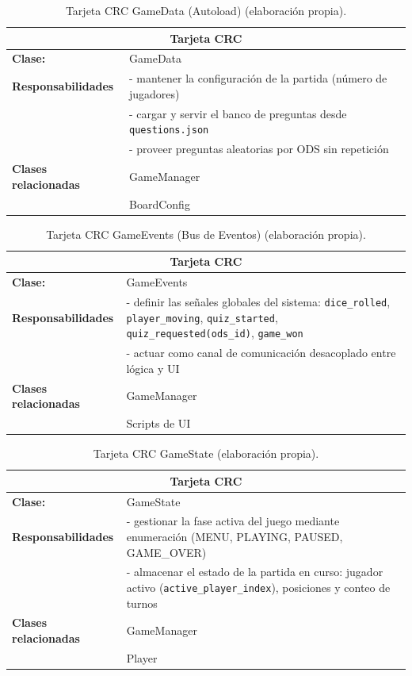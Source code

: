 \begin{table}[H]
\centering
\caption{Tarjeta CRC GameData (Autoload) (elaboración propia).\label{tab:crc_gamedata}}
\begin{tabular}{|p{}|p{}|}
\hline
\multicolumn{2}{|c|}{\textbf{Tarjeta CRC}} \\
\hline
\textbf{Clase:} & GameData \\
\hline
\textbf{Responsabilidades} & - mantener la configuración de la partida (número de jugadores) \\
& - cargar y servir el banco de preguntas desde \texttt{questions.json} \\
& - proveer preguntas aleatorias por ODS sin repetición \\
\hline
\textbf{Clases relacionadas} & GameManager \\
& BoardConfig \\
\hline
\end{tabular}
\end{table}

\begin{table}[H]
\centering
\caption{Tarjeta CRC GameEvents (Bus de Eventos) (elaboración propia).\label{tab:crc_gameevents}}
\begin{tabular}{|p{}|p{}|}
\hline
\multicolumn{2}{|c|}{\textbf{Tarjeta CRC}} \\
\hline
\textbf{Clase:} & GameEvents \\
\hline
\textbf{Responsabilidades} & - definir las se\~nales globales del sistema: \texttt{dice\_rolled}, \texttt{player\_moving}, \texttt{quiz\_started}, \texttt{quiz\_requested(ods\_id)}, \texttt{game\_won} \\
& - actuar como canal de comunicación desacoplado entre lógica y UI \\
\hline
\textbf{Clases relacionadas} & GameManager \\
& Scripts de UI \\
\hline
\end{tabular}
\end{table}

\begin{table}[H]
\centering
\caption{Tarjeta CRC GameState (elaboración propia).\label{tab:crc_gamestate}}
\begin{tabular}{|p{}|p{}|}
\hline
\multicolumn{2}{|c|}{\textbf{Tarjeta CRC}} \\
\hline
\textbf{Clase:} & GameState \\
\hline
\textbf{Responsabilidades} & - gestionar la fase activa del juego mediante enumeración (MENU, PLAYING, PAUSED, GAME\_OVER) \\
& - almacenar el estado de la partida en curso: jugador activo (\texttt{active\_player\_index}), posiciones y conteo de turnos \\
\hline
\textbf{Clases relacionadas} & GameManager \\
& Player \\
\hline
\end{tabular}
\end{table}

